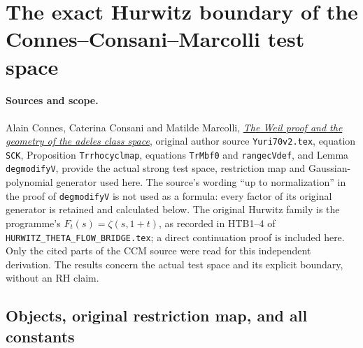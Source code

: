 \section{The exact Hurwitz boundary of the Connes--Consani--Marcolli test space}
\label{sec:hurwitz-cc-test-space-boundary}

\paragraph{Sources and scope.}
Alain Connes, Caterina Consani and Matilde Marcolli,
\href{https://arxiv.org/abs/math/0703392}{\emph{The Weil proof and the
geometry of the adeles class space}}, original author source
\texttt{Yuri70v2.tex}, equation \texttt{SCK}, Proposition
\texttt{Trrhocyclmap}, equations \texttt{TrMbf0} and
\texttt{rangecVdef}, and Lemma \texttt{degmodifyV}, provide the actual
strong test space, restriction map and Gaussian-polynomial generator
used here. The source's wording ``up to normalization'' in the proof
of \texttt{degmodifyV} is not used as a formula: every factor of its
original generator is retained and calculated below. The original
Hurwitz family is the programme's $F_t(s)=\zeta(s,1+t)$, as recorded
in HTB1--4 of \texttt{HURWITZ\_THETA\_FLOW\_BRIDGE.tex}; a direct
continuation proof is included here. Only the cited parts of the CCM
source were read for this independent derivation. The results concern
the actual test space and its explicit boundary, without an RH claim.

\subsection{Objects, original restriction map, and all constants}

